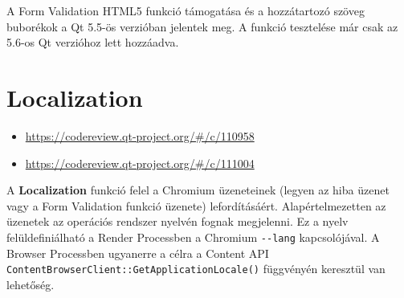 \documentclass[12pt]{report}
\let\origurl\url
\renewcommand{\url}[1]{%
    \textcolor{blue}{\origurl{#1}}
}
\newcommand{\gerrit}[1]{%
    \textcolor{qtgreen}{\origurl{https://codereview.qt-project.org/\#/c/#1}}
}
\begin{document}
A Form Validation HTML5 funkció támogatása és a hozzátartozó szöveg buborékok a Qt 5.5-ös
verzióban jelentek meg. A funkció tesztelése már csak az 5.6-os Qt verzióhoz lett hozzáadva.


\section{Localization}

\begin{center}
    \begin{reviewbox}
        \begin{itemize}
            \renewcommand{\labelitemi}{\textcolor{qtgreen}{$\blacktriangleright$}}
            \item \gerrit{110958}
            \item \gerrit{111004}
        \end{itemize}
    \end{reviewbox}
\end{center}

\noindent
A \textbf{Localization} funkció felel a Chromium üzeneteinek (legyen az hiba üzenet vagy
a Form Validation funkció üzenete) lefordításáért. Alapértelmezetten az üzenetek az
operációs rendszer nyelvén fognak megjelenni. Ez a nyelv felüldefiniálható
a Render Processben a Chromium \texttt{-{}-lang} kapcsolójával. A Browser Processben
ugyanerre a célra a Content API \texttt{ContentBrowserClient::GetApplicationLocale()}
függvényén keresztül van lehetőség.
\end{document}
